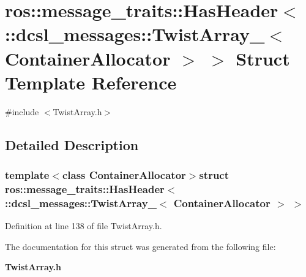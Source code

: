\section{ros\-:\-:message\-\_\-traits\-:\-:\-Has\-Header$<$ \-:\-:dcsl\-\_\-messages\-:\-:\-Twist\-Array\-\_\-$<$ \-Container\-Allocator $>$ $>$ \-Struct \-Template \-Reference}
\label{structros_1_1message__traits_1_1HasHeader_3_01_1_1dcsl__messages_1_1TwistArray___3_01ContainerAllocator_01_4_01_4}


{\ttfamily \#include $<$\-Twist\-Array.\-h$>$}



\subsection{\-Detailed \-Description}
\subsubsection*{template$<$class Container\-Allocator$>$struct ros\-::message\-\_\-traits\-::\-Has\-Header$<$ \-::dcsl\-\_\-messages\-::\-Twist\-Array\-\_\-$<$ Container\-Allocator $>$ $>$}



\-Definition at line 138 of file \-Twist\-Array.\-h.



\-The documentation for this struct was generated from the following file\-:\begin{DoxyCompactItemize}
\item 
{\bf \-Twist\-Array.\-h}\end{DoxyCompactItemize}

